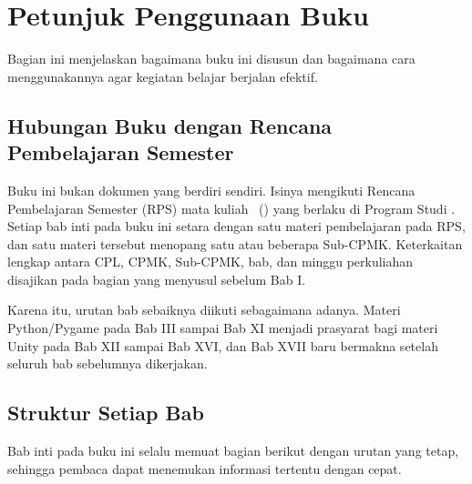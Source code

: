 
\chapter*{Petunjuk Penggunaan Buku}
\thispagestyle{plain}

Bagian ini menjelaskan bagaimana buku ini disusun dan bagaimana cara
menggunakannya agar kegiatan belajar berjalan efektif.

\section*{Hubungan Buku dengan Rencana Pembelajaran Semester}

Buku ini bukan dokumen yang berdiri sendiri. Isinya mengikuti Rencana
Pembelajaran Semester (RPS) mata kuliah \NamaMK\ (\KodeMK) yang berlaku di
Program Studi \NamaProdi. Setiap bab inti pada buku ini setara dengan satu
materi pembelajaran pada RPS, dan satu materi tersebut menopang satu atau
beberapa Sub-CPMK. Keterkaitan lengkap antara CPL, CPMK, Sub-CPMK, bab, dan
minggu perkuliahan disajikan pada bagian  yang menyusul sebelum Bab I.

Karena itu, urutan bab sebaiknya diikuti sebagaimana adanya. Materi
Python/Pygame pada Bab III sampai Bab XI menjadi prasyarat bagi materi
Unity pada Bab XII sampai Bab XVI, dan Bab XVII baru bermakna setelah
seluruh bab sebelumnya dikerjakan.

\section*{Struktur Setiap Bab}

Bab inti pada buku ini selalu memuat bagian berikut dengan urutan yang
tetap, sehingga pembaca dapat menemukan informasi tertentu dengan cepat.


